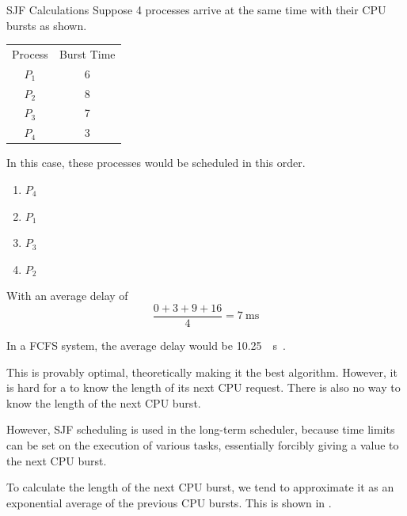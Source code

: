 \begin{example}[]{SJF Calculations}
  Suppose 4 processes arrive at the same time with their CPU bursts as shown.
  \begin{center}
    \begin{tabular}{cc}
      \toprule
      Process & Burst Time \\
      $P_{1}$ & 6 \\
      $P_{2}$ & 8 \\
      $P_{3}$ & 7 \\
      $P_{4}$ & 3 \\
      \bottomrule
    \end{tabular}
  \end{center}
  \tcblower{}
  In this case, these processes would be scheduled in this order.
  \begin{enumerate}[noitemsep]
  \item $P_{4}$
  \item $P_{1}$
  \item $P_{3}$
  \item $P_{2}$
  \end{enumerate}
  With an average delay of
  \begin{equation*}
    \frac{0+3+9+16}{4} = \SI{7}{\milli \second}
  \end{equation*}

  In a FCFS system, the average delay would be \SI{10.25}{\milli{} \second{}}.
\end{example}

This is provably optimal, theoretically making it the best algorithm.
However, it is hard for a  to know the length of its next CPU request.
There is also no way to know the length of the next CPU burst.

However, SJF scheduling is used in the long-term scheduler, because time limits can be set on the execution of various tasks, essentially forcibly giving a value to the next CPU burst.

To calculate the length of the next CPU burst, we tend to approximate it as an exponential average of the previous CPU bursts.
This is shown in .

